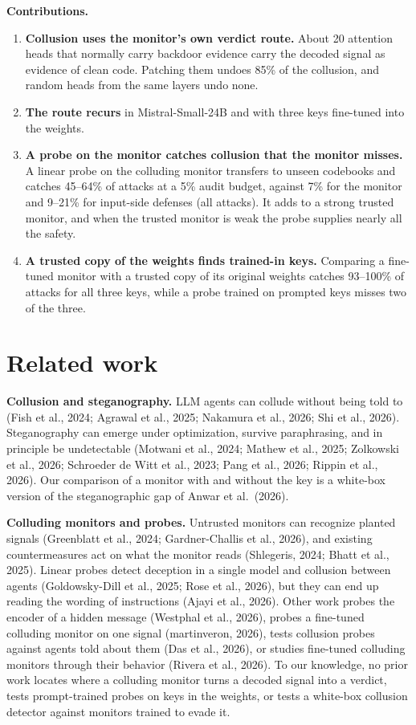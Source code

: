 \documentclass[11pt,letterpaper]{article}
\providecommand{\tightlist}{\setlength{\itemsep}{1pt}\setlength{\parskip}{0pt}}
\begin{document}
\textbf{Contributions.}

\begin{enumerate}
\def\labelenumi{\arabic{enumi}.}
\tightlist
\item
  \textbf{Collusion uses the monitor's own verdict route.} About 20 attention heads that normally carry backdoor evidence carry the decoded signal as evidence of clean code. Patching them undoes 85\% of the collusion, and random heads from the same layers undo none.
\item
  \textbf{The route recurs} in Mistral-Small-24B and with three keys fine-tuned into the weights.
\item
  \textbf{A probe on the monitor catches collusion that the monitor misses.} A linear probe on the colluding monitor transfers to unseen codebooks and catches 45--64\% of attacks at a 5\% audit budget, against 7\% for the monitor and 9--21\% for input-side defenses (all attacks). It adds to a strong trusted monitor, and when the trusted monitor is weak the probe supplies nearly all the safety.
\item
  \textbf{A trusted copy of the weights finds trained-in keys.} Comparing a fine-tuned monitor with a trusted copy of its original weights catches 93--100\% of attacks for all three keys, while a probe trained on prompted keys misses two of the three.
\end{enumerate}

\section{Related work}

\textbf{Collusion and steganography.} LLM agents can collude without being told to (Fish et al., 2024; Agrawal et al., 2025; Nakamura et al., 2026; Shi et al., 2026). Steganography can emerge under optimization, survive paraphrasing, and in principle be undetectable (Motwani et al., 2024; Mathew et al., 2025; Zolkowski et al., 2026; Schroeder de Witt et al., 2023; Pang et al., 2026; Rippin et al., 2026). Our comparison of a monitor with and without the key is a white-box version of the steganographic gap of Anwar et al.~(2026).

\textbf{Colluding monitors and probes.} Untrusted monitors can recognize planted signals (Greenblatt et al., 2024; Gardner-Challis et al., 2026), and existing countermeasures act on what the monitor reads (Shlegeris, 2024; Bhatt et al., 2025). Linear probes detect deception in a single model and collusion between agents (Goldowsky-Dill et al., 2025; Rose et al., 2026), but they can end up reading the wording of instructions (Ajayi et al., 2026). Other work probes the encoder of a hidden message (Westphal et al., 2026), probes a fine-tuned colluding monitor on one signal (martinveron, 2026), tests collusion probes against agents told about them (Das et al., 2026), or studies fine-tuned colluding monitors through their behavior (Rivera et al., 2026). To our knowledge, no prior work locates where a colluding monitor turns a decoded signal into a verdict, tests prompt-trained probes on keys in the weights, or tests a white-box collusion detector against monitors trained to evade it.
\end{document}
